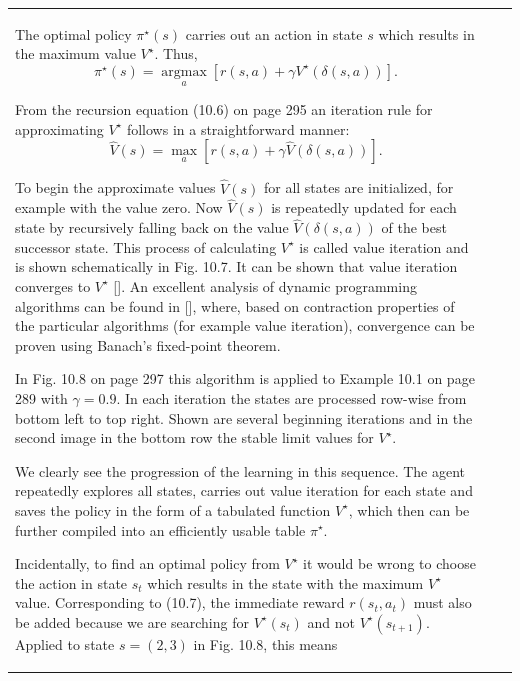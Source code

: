 \documentclass[10pt]{book}
\begin{document}
\begin{center}
\begin{tabular}{|l|l|l|}
The optimal policy $\pi^{\star}(s)$ carries out an action in state $s$ which results in the maximum value $V^{\star}$. Thus,
\begin{equation*}
\pi^{\star}(s)=\underset{a}{\operatorname{argmax}}\left[r(s, a)+\gamma V^{\star}(\delta(s, a))\right] . \tag{10.7}
\end{equation*}

From the recursion equation (10.6) on page 295 an iteration rule for approximating $V^{\star}$ follows in a straightforward manner:
\begin{equation*}
\hat{V}(s)=\max _{a}[r(s, a)+\gamma \hat{V}(\delta(s, a))] . \tag{10.8}
\end{equation*}

To begin the approximate values $\hat{V}(s)$ for all states are initialized, for example with the value zero. Now $\hat{V}(s)$ is repeatedly updated for each state by recursively falling back on the value $\hat{V}(\delta(s, a))$ of the best successor state. This process of calculating $V^{\star}$ is called value iteration and is shown schematically in Fig. 10.7. It can be shown that value iteration converges to $V^{\star}$ [\cite{sb98}]. An excellent analysis of dynamic programming algorithms can be found in [\cite{sze10}], where, based on contraction properties of the particular algorithms (for example value iteration), convergence can be proven using Banach's fixed-point theorem.

In Fig. 10.8 on page 297 this algorithm is applied to Example 10.1 on page 289 with $\gamma=0.9$. In each iteration the states are processed row-wise from bottom left to top right. Shown are several beginning iterations and in the second image in the bottom row the stable limit values for $V^{\star}$.

We clearly see the progression of the learning in this sequence. The agent repeatedly explores all states, carries out value iteration for each state and saves the policy in the form of a tabulated function $V^{\star}$, which then can be further compiled into an efficiently usable table $\pi^{\star}$.

Incidentally, to find an optimal policy from $V^{\star}$ it would be wrong to choose the action in state $s_{t}$ which results in the state with the maximum $V^{\star}$ value. Corresponding to (10.7), the immediate reward $r\left(s_{t}, a_{t}\right)$ must also be added because we are searching for $V^{\star}\left(s_{t}\right)$ and not $V^{\star}\left(s_{t+1}\right)$. Applied to state $s=(2,3)$ in Fig. 10.8, this means


\end{tabular}
\end{center}
\end{document}
